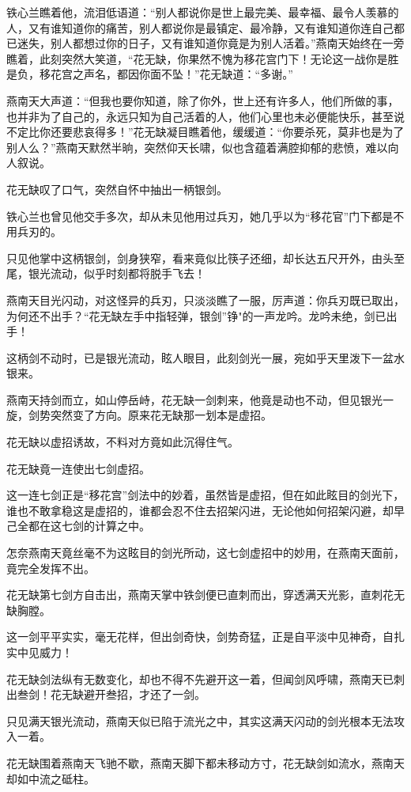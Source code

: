\documentclass[12pt,oneside]{book}
\begin{document}
铁心兰瞧着他，流泪低语道：``别人都说你是世上最完美、最幸福、最令人羡慕的人，又有谁知道你的痛苦，别人都说你是最镇定、最冷静，又有谁知道你连自己都已迷失，别人都想过你的日子，又有谁知道你竟是为别人活着。''燕南天始终在一旁瞧着，此刻突然大笑道，``花无缺，你果然不愧为移花宫门下！无论这一战你是胜是负，移花宫之声名，都因你面不坠！''花无缺道：``多谢。''

燕南天大声道：``但我也要你知道，除了你外，世上还有许多人，他们所做的事，也并非为了自己的，永远只知为自己活着的人，他们心里也未必便能快乐，甚至说不定比你还要悲哀得多！''花无缺凝目瞧着他，缓缓道：``你要杀死，莫非也是为了别人么？''燕南天默然半晌，突然仰天长啸，似也含蕴着满腔抑郁的悲愤，难以向人叙说。

花无缺叹了口气，突然自怀中抽出一柄银剑。

铁心兰也曾见他交手多次，却从未见他用过兵刃，她几乎以为``移花官''门下都是不用兵刃的。

只见他掌中这柄银剑，剑身狭窄，看来竟似比筷子还细，却长达五尺开外，由头至尾，银光流动，似乎时刻都将脱手飞去！

燕南天目光闪动，对这怪异的兵刃，只淡淡瞧了一服，厉声道：你兵刃既已取出，为何还不出手？``花无缺左手中指轻弹，银剑''铮"的一声龙吟。龙吟未绝，剑已出手！

这柄剑不动时，已是银光流动，眩人眼目，此刻剑光一展，宛如乎天里泼下一盆水银来。

燕南天持剑而立，如山停岳峙，花无缺一剑刺来，他竟是动也不动，但见银光一旋，剑势突然变了方向。原来花无缺那一划本是虚招。

花无缺以虚招诱故，不料对方竟如此沉得住气。

花无缺竟一连使出七剑虚招。

这一连七剑正是``移花宫''剑法中的妙着，虽然皆是虚招，但在如此眩目的剑光下，谁也不敢拿稳这是虚招的，谁都会忍不住去招架闪进，无论他如何招架闪避，却早己全都在这七剑的计算之中。

怎奈燕南天竟丝毫不为这眩目的剑光所动，这七剑虚招中的妙用，在燕南天面前，竟完全发挥不出。

花无缺第七剑方自击出，燕南天掌中铁剑便已直刺而出，穿透满天光影，直刺花无缺胸膛。

这一剑平平实实，毫无花样，但出剑奇快，剑势奇猛，正是自平淡中见神奇，自扎实中见威力！

花无缺剑法纵有无数变化，却也不得不先避开这一着，但闻剑风呼啸，燕南天已刺出叁剑！花无缺避开叁招，才还了一剑。

只见满天银光流动，燕南天似已陷于流光之中，其实这满天闪动的剑光根本无法攻入一着。

花无缺围着燕南天飞驰不歇，燕南天脚下都未移动方寸，花无缺剑如流水，燕南天却如中流之砥柱。
\end{document}
